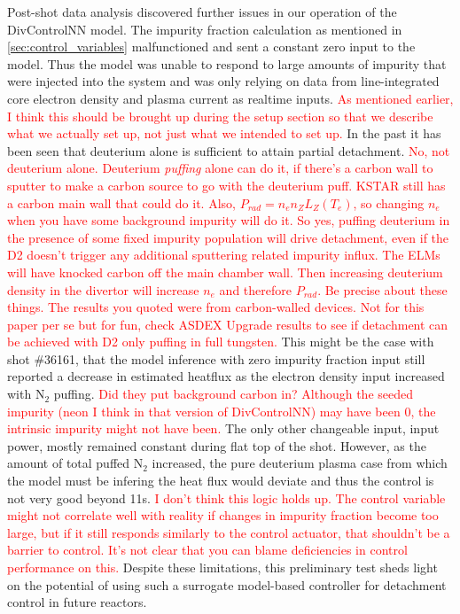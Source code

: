 Post-shot data analysis discovered further issues in our operation of the DivControlNN model.
The impurity fraction calculation as mentioned in \ref{sec:control_variables} malfunctioned and sent a constant zero input to the model.
Thus the model was unable to respond to large amounts of impurity that were injected into the system and was only relying on data from line-integrated core electron density and plasma current as realtime inputs.
\textcolor{red}{As mentioned earlier, I think this should be brought up during the setup section so that we describe what we actually set up, not just what we intended to set up.}
In the past it has been seen that deuterium alone is sufficient to attain partial detachment\cite{Loarte_1998_NF, Eldon_2017_NF}.
\textcolor{red}{No, not deuterium alone. Deuterium \emph{puffing} alone can do it, if there's a carbon wall to sputter to make a carbon source to go with the deuterium puff. KSTAR still has a carbon main wall that could do it. Also, $P_{rad}=n_e n_Z L_Z(T_e)$, so changing $n_e$ when you have some background impurity will do it. So yes, puffing deuterium in the presence of some fixed impurity population will drive detachment, even if the D2 doesn't trigger any additional sputtering related impurity influx. The ELMs will have knocked carbon off the main chamber wall. Then increasing deuterium density in the divertor will increase $n_e$ and therefore $P_{rad}$. Be precise about these things. The results you quoted were from carbon-walled devices. Not for this paper per se but for fun, check ASDEX Upgrade results to see if detachment can be achieved with D2 only puffing in full tungsten.}
This might be the case with shot \#36161, that the model inference with zero impurity fraction input still reported a decrease in estimated heatflux as the electron density input increased with N$_2$ puffing.
\textcolor{red}{Did they put background carbon in? Although the seeded impurity (neon I think in that version of DivControlNN) may have been 0, the intrinsic impurity might not have been.}
The only other changeable input, input power, mostly remained constant during flat top of the shot.
However, as the amount of total puffed N$_2$ increased, the pure deuterium plasma case from which the model must be infering the heat flux would deviate and thus the control is not very good beyond 11s.
\textcolor{red}{I don't think this logic holds up. The control variable might not correlate well with reality if changes in impurity fraction become too large, but if it still responds similarly to the control actuator, that shouldn't be a barrier to control. It's not clear that you can blame deficiencies in control performance on this.}
Despite these limitations, this preliminary test sheds light on the potential of using such a surrogate model-based controller for detachment control in future reactors.
